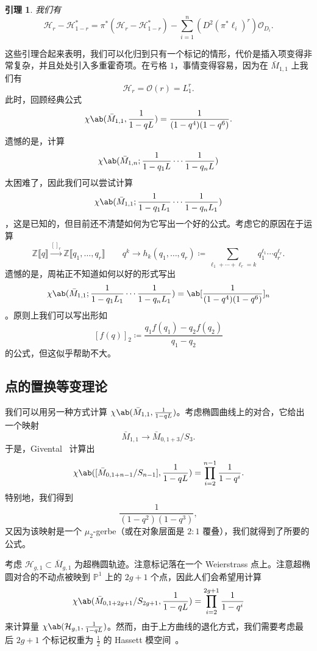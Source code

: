 \documentclass{amsart}
\newtheorem{lem}[thm]{引理}
\theoremstyle{definition}
\theoremstyle{remark}
\theoremstyle{plain}
\theoremstyle{definition}
\theoremstyle{remark}
\newcommand{\Z}{\mathbb{Z}}
\renewcommand{\P}{\mathbb{P}}
\newcommand{\mc}[1]{\mathcal{#1}}
\newcommand{\1}{\mathbf{1}}
\newcommand{\2}{\mathbf{2}}
\newcommand{\3}{\mathbf{3}}
\newcommand{\ps}[1]{\llbracket #1 \rrbracket}
\begin{document}
\begin{lem}
    我们有
    \[ \mc{H}_r - \mc{H}_{1-r}^* = \pi^* (\mc{H}_r - \mc{H}_{1-r}^*) - \sum_{i=1}^n (D^2 (\pi^* \ell_i)^r) \mc{O}_{D_i}. \]
\end{lem}

这些引理合起来表明，我们可以化归到只有一个标记的情形，代价是插入项变得非常复杂，并且处处引入多重霍奇项。在亏格 \(1\)，事情变得容易，因为在 \(\bar{M}_{1,1}\) 上我们有
\[ \mc{H}_r = \mc{O}(r) = L_1^r. \]
此时，回顾经典公式
\[ \chi\ab(\bar{M}_{1,1}, \frac{1}{1-qL}) = \frac{1}{(1-q^4)(1-q^6)}. \]
遗憾的是，计算
\[ \chi\ab(\bar{M}_{1,n}; \frac{1}{1-q_1 L} \cdots \frac{1}{1-q_n L}) \]
太困难了，因此我们可以尝试计算
\[ \chi\ab(\bar{M}_{1,1}; \frac{1}{1-q_1 L_1} \cdots \frac{1}{1-q_n L_1})  \]
，这是已知的，但目前还不清楚如何为它写出一个好的公式。考虑它的原因在于运算
\[ \Z\ps{q} \xrightarrow{[]_r} \Z\ps{q_1, \ldots, q_r} \qquad q^k \to h_k(q_1, \ldots, q_r) \coloneqq \sum_{\ell_1 + \cdots + \ell_r = k} q_1^{\ell_1} \cdots q_r^{\ell_r}. \]
遗憾的是，周祐正不知道如何以好的形式写出
\[ \chi\ab(\bar{M}_{1,1}; \frac{1}{1-q_1 L_1} \cdots \frac{1}{1-q_n L_1}) = \ab[\frac{1}{(1-q^4)(1-q^6)}]_n \]
。原则上我们可以写出形如
\[ [f(q)]_2 \coloneqq \frac{q_1 f(q_1) - q_2 f(q_2)}{q_1 - q_2} \]
的公式，但这似乎帮助不大。

\subsection{点的置换等变理论}%
\label{sub:Permutation-equivariant theory of a point}

我们可以用另一种方式计算 \(\chi\ab(\bar{M}_{1,1}, \frac{1}{1-q L})\)。考虑椭圆曲线上的对合，它给出一个映射
\[ \bar{M}_{1,1} \to \bar{M}_{0,1+3}/S_3. \]
于是，Givental~\cite{Givental2017K1} 计算出
\[ \chi\ab([\bar{M}_{0,1+n-1}/S_{n-1}], \frac{1}{1-qL}) = \prod_{i=2}^{n-1} \frac{1}{1-q^i}. \]
特别地，我们得到
\[ \frac{1}{(1-q^2)(1-q^3)}, \]
又因为该映射是一个 \(\mu_2\)-gerbe（或在对象层面是 \(2:1\) 覆叠），我们就得到了所要的公式。

考虑 \(\mc{H}_{g,1} \subset \bar{M}_{g,1}\) 为超椭圆轨迹。注意标记落在一个 Weierstrass 点上。注意超椭圆对合的不动点被映到 \(\P^1\) 上的 \(2g+1\) 个点，因此人们会希望用计算
\[ \chi\ab(\bar{M}_{0,1+2g+1}/S_{2g+1}, \frac{1}{1-q L}) = \prod_{i=2}^{2g+1} \frac{1}{1-q^i} \]
来计算量
\(\chi\ab(\mc{H}_{g,1}, \frac{1}{1-qL})\)。然而，由于上方曲线的退化方式，我们需要考虑最后 \(2g+1\) 个标记权重为 \(\frac{1}{2}\) 的 Hassett 模空间~\cite{Hassett2003}。
 
\end{document}
